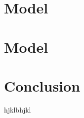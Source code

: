 \documentclass[12pt]{article}
\begin{document}
\section{Model}\label{section:theory}


\section{Model}\label{section:experiments}




\section{Conclusion}\label{section:conclusions}
hjklbhjkl







 
\end{document}
